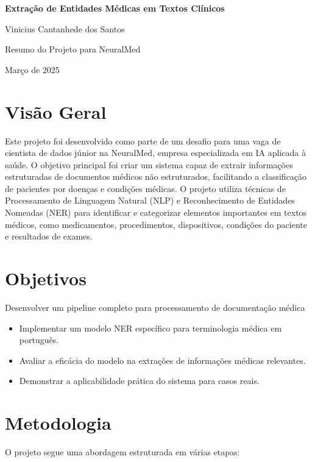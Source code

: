 \documentclass{article}
\begin{document}
\begin{titlepage}
    \centering
    {\Huge\bfseries Extração de Entidades Médicas em Textos Clínicos\par}
    \vspace{1cm}
    {\Large Vinicius Cantanhede dos Santos\par}
    \vspace{1cm}
    {\large Resumo do Projeto para NeuralMed\par}
    \vspace{1cm}
    {\large Março de 2025\par}
\end{titlepage}

\section{Visão Geral}
Este projeto foi desenvolvido como parte de um desafio para uma vaga de cientista de dados júnior na NeuralMed, empresa especializada em IA aplicada à saúde. O objetivo principal foi criar um sistema capaz de extrair informações estruturadas de documentos médicos não estruturados, facilitando a classificação de pacientes por doenças e condições médicas.
O projeto utiliza técnicas de Processamento de Linguagem Natural (NLP) e Reconhecimento de Entidades Nomeadas (NER) para identificar e categorizar elementos importantes em textos médicos, como medicamentos, procedimentos, dispositivos, condições do paciente e resultados de exames.
\section{Objetivos}
Desenvolver um pipeline completo para processamento de documentação médica
\begin{itemize}
    \item Implementar um modelo NER específico para terminologia médica em português.
    \item Avaliar a eficácia do modelo na extrações de informações médicas relevantes.
    \item Demonstrar a aplicabilidade prática do sistema para casos reais.
\end{itemize}
\section{Metodologia}
O projeto segue uma abordagem estruturada em várias etapas: 
\end{document}
